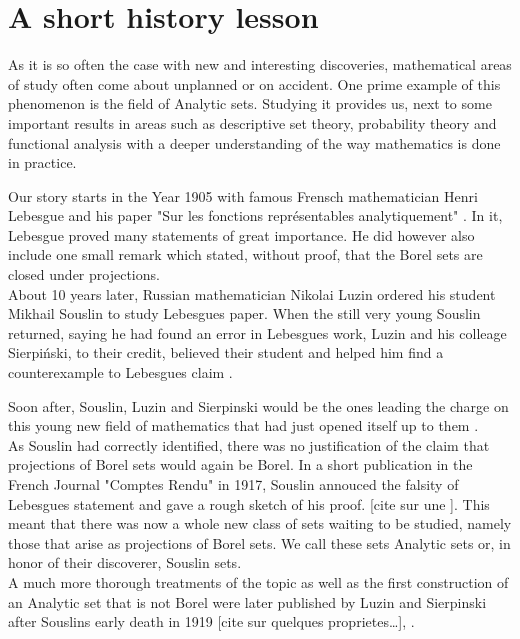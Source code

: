 \documentclass[10pt, a4paper, titlepage]{article}
\numberwithin{equation}{section}
\begin{document}
\hypersetup{pageanchor=false}


\newpage

\thispagestyle{empty}



\newpage

\tableofcontents

\newpage
\hypersetup{pageanchor=true}
\renewcommand{\thepage}{ \arabic{page} }

\setcounter{page}{1}
\onehalfspacing







\section{A short history lesson}
As it is so often the case with new and interesting discoveries, mathematical areas of study often come about unplanned or on accident. 
One prime example of this phenomenon is the field of Analytic sets. 
Studying it provides us, next to some important results in areas such as descriptive set theory, probability theory and functional analysis with a deeper understanding of the way mathematics is done in practice.

Our story starts in the Year 1905 with famous Frensch mathematician Henri Lebesgue and his paper "Sur les fonctions représentables analytiquement" \cite{lebesgue1905}. 
In it, Lebesgue proved many statements of great importance. 
He did however also include one small remark which stated, without proof, that the Borel sets are closed under projections. \\
About 10 years later, Russian mathematician Nikolai Luzin ordered his student Mikhail Souslin to study Lebesgues paper. 
When the still very young Souslin returned, saying he had found an error in Lebesgues work, Luzin and his colleage Sierpiński, to their credit, believed their student and helped him find a counterexample to Lebesgues claim \cite{sierpinski1950}.

Soon after, Souslin, Luzin and Sierpinski would be the ones leading the charge on this young new field of mathematics that had just opened itself up to them \cite{rogers1980}. \\
As Souslin had correctly identified, there was no justification of the claim that projections of Borel sets would again be Borel.
In a short publication in the French Journal "Comptes Rendu" in 1917, Souslin annouced the falsity of Lebesgues statement and gave a rough sketch of his proof. [cite sur une ].
This meant that there was now a whole new class of sets waiting to be studied, namely those that arise as projections of Borel sets. We call these sets Analytic sets or, in honor of their discoverer, Souslin sets.\\
A much more thorough treatments of the topic as well as the first construction of an Analytic set that is not Borel were later published by Luzin and Sierpinski after Souslins early death in 1919 [cite sur quelques proprietes\ldots], \cite{lusin1923} \cite{lusin1927}.
\end{document}
